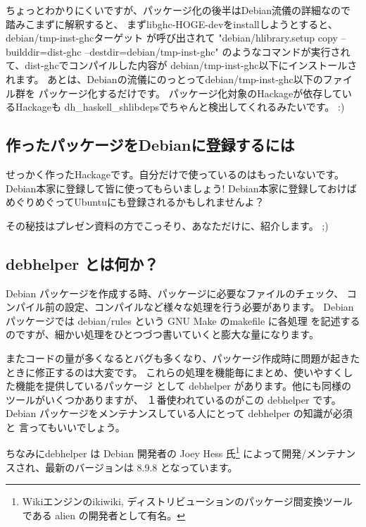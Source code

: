 \documentclass[mingoth,a4paper]{jsarticle}
\begin{document}
ちょっとわかりにくいですが、パッケージ化の後半はDebian流儀の詳細なので
踏みこまずに解釈すると、
まずlibghc-HOGE-devをinstallしようとすると、debian/tmp-inst-ghcターゲット
が呼び出されて
"debian/hlibrary.setup copy --builddir=dist-ghc --destdir=debian/tmp-inst-ghc"
のようなコマンドが実行されて、dist-ghcでコンパイルした内容が
debian/tmp-inst-ghc以下にインストールされます。
あとは、Debianの流儀にのっとってdebian/tmp-inst-ghc以下のファイル群を
パッケージ化するだけです。
パッケージ化対象のHackageが依存しているHackageも
dh\_haskell\_shlibdepsでちゃんと検出してくれるみたいです。 :)

\subsection{作ったパッケージをDebianに登録するには}

せっかく作ったHackageです。自分だけで使っているのはもったいないです。
Debian本家に登録して皆に使ってもらいましょう!
Debian本家に登録しておけばめぐりめぐってUbuntuにも登録されるかもしれませんよ？

その秘技はプレゼン資料の方でこっそり、あなただけに、紹介します。 ;)


\subsection{debhelper とは何か？}

Debian パッケージを作成する時、パッケージに必要なファイルのチェック、
コンパイル前の設定、コンパイルなど様々な処理を行う必要があります。
Debianパッケージでは debian/rules という GNU Make のmakefile に各処理
を記述するのですが、細かい処理をひとつづつ書いていくと膨大な量になります。

またコードの量が多くなるとバグも多くなり、パッケージ作成時に問題が起きた
ときに修正するのは大変です。
これらの処理を機能毎にまとめ、使いやすくした機能を提供しているパッケージ
として debhelper があります。他にも同様のツールがいくつかありますが、
１番使われているのがこの debhelper です。
Debian パッケージをメンテナンスしている人にとって debhelper の知識が必須と
言ってもいいでしょう。

ちなみにdebhelper は Debian 開発者の Joey Hess 氏\footnote{Wikiエンジンのikiwiki, 
ディストリビューションのパッケージ間変換ツールである alien の開発者として有名。}
によって開発/メンテナンスされ、最新のバージョンは 8.9.8 となっています。
\end{document}
